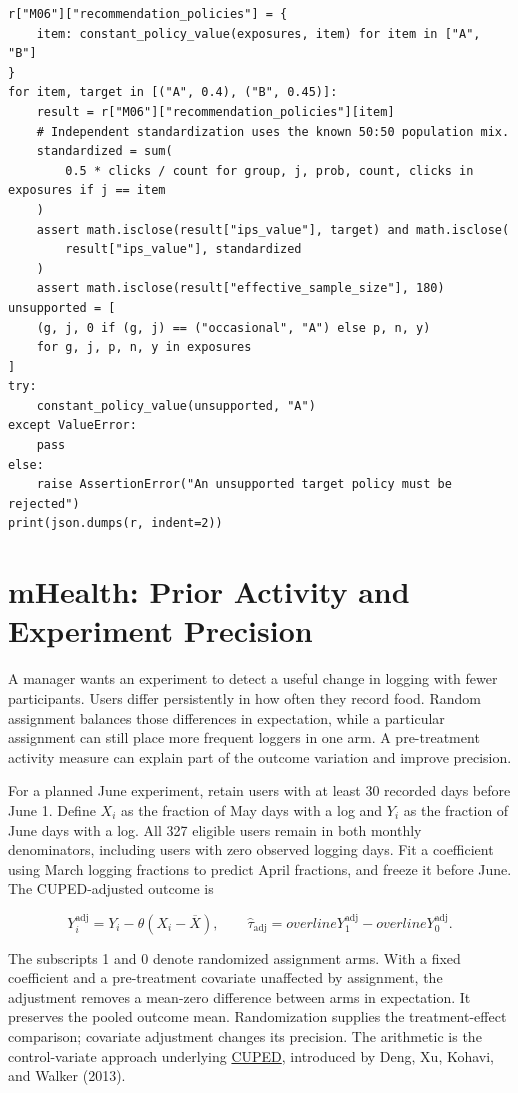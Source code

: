 \begin{Verbatim}[breaklines,breakanywhere,fontsize=\small]
r["M06"]["recommendation_policies"] = {
    item: constant_policy_value(exposures, item) for item in ["A", "B"]
}
for item, target in [("A", 0.4), ("B", 0.45)]:
    result = r["M06"]["recommendation_policies"][item]
    # Independent standardization uses the known 50:50 population mix.
    standardized = sum(
        0.5 * clicks / count for group, j, prob, count, clicks in exposures if j == item
    )
    assert math.isclose(result["ips_value"], target) and math.isclose(
        result["ips_value"], standardized
    )
    assert math.isclose(result["effective_sample_size"], 180)
unsupported = [
    (g, j, 0 if (g, j) == ("occasional", "A") else p, n, y)
    for g, j, p, n, y in exposures
]
try:
    constant_policy_value(unsupported, "A")
except ValueError:
    pass
else:
    raise AssertionError("An unsupported target policy must be rejected")
print(json.dumps(r, indent=2))
\end{Verbatim}

\hypertarget{M06-mhealth-prior-activity-and-experiment-precision}{%
\section{mHealth: Prior Activity and Experiment
Precision}\label{M06-mhealth-prior-activity-and-experiment-precision}}

\noindent A manager wants an experiment to detect a useful change in logging with
fewer participants. Users differ persistently in how often they record
food. Random assignment balances those differences in expectation, while
a particular assignment can still place more frequent loggers in one
arm. A pre-treatment activity measure can explain part of the outcome
variation and improve precision.

For a planned June experiment, retain users with at least 30 recorded
days before June 1. Define \(X_i\) as the fraction of May days with a
log and \(Y_i\) as the fraction of June days with a log. All 327
eligible users remain in both monthly denominators, including users with
zero observed logging days. Fit a coefficient using March logging
fractions to predict April fractions, and freeze it before June. The
CUPED-adjusted outcome is

\[
Y_i^{\mathrm{adj}}=Y_i-\theta(X_i-\overline X),
\qquad
\widehat\tau_{\mathrm{adj}}=overline Y_1^{\mathrm{adj}}-overline Y_0^{\mathrm{adj}}.
\]

The subscripts 1 and 0 denote randomized assignment arms. With a fixed
coefficient and a pre-treatment covariate unaffected by assignment, the
adjustment removes a mean-zero difference between arms in expectation.
It preserves the pooled outcome mean. Randomization supplies the
treatment-effect comparison; covariate adjustment changes its precision.
The arithmetic is the control-variate approach underlying
\href{https://exp-platform.com/cuped/}{CUPED}, introduced by Deng, Xu,
Kohavi, and Walker (2013).

